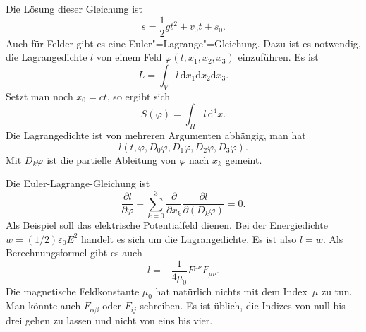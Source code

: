 \documentclass[a4paper,10pt,fleqn,twocolumn,twoside]{article}
\numberwithin{equation}{section}
\begin{document}
Die Lösung dieser Gleichung ist
\begin{equation}
s=\frac{1}{2}gt^2+v_0t+s_0.
\end{equation}
%
Auch für Felder gibt es eine Euler"=Lagrange"=Gleichung. Dazu ist es
notwendig, die Lagrangedichte $l$ von einem Feld
$\varphi(t,x_1,x_2,x_3)$ einzuführen. Es ist
\begin{equation}
L = \int_V l\,\mathrm dx_1\mathrm dx_2\mathrm dx_3.
\end{equation}
Setzt man noch $x_0=ct$, so ergibt sich
\begin{equation}
S(\varphi) = \int_H l\,\mathrm d^4x.
\end{equation}
Die Lagrangedichte ist von mehreren Argumenten abhängig, man hat
\begin{equation}
l(t,\varphi,D_0\varphi, D_1\varphi, D_2\varphi, D_3\varphi).
\end{equation}
Mit $D_k\varphi$ ist die partielle Ableitung von $\varphi$
nach $x_k$ gemeint.

Die Euler-Lagrange-Gleichung ist
\begin{equation}
\frac{\partial l}{\partial\varphi}
- \sum_{k=0}^3 \frac{\partial}{\partial x_k}
\frac{\partial l}{\partial (D_k\varphi)}=0.
\end{equation}
Als Beispiel soll das elektrische Potentialfeld dienen.
Bei der Energiedichte $w=(1/2)\varepsilon_0 E^2$ handelt es sich
um die Lagrangedichte. Es ist also $l=w$.
Als Berechnungsformel gibt es auch
\begin{equation}
l = -\frac{1}{4\mu_0} F^{\mu\nu}F_{\mu\nu}.
\end{equation}
Die magnetische Feldkonstante $\mu_0$ hat natürlich nichts
mit dem Index~$\mu$ zu tun. Man könnte auch $F_{\alpha\beta}$
oder $F_{ij}$ schreiben. Es ist üblich, die Indizes von null bis
drei gehen zu lassen und nicht von eins bis vier.
\end{document}
